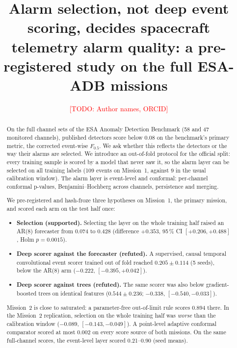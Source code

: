 \documentclass[preprint,12pt,authoryear]{elsarticle}
\newcommand{\todo}[1]{\textcolor{red}{[TODO: #1]}}
\begin{document}
\begin{frontmatter}
\title{Alarm selection, not deep event scoring, decides spacecraft telemetry alarm quality:
a pre-registered study on the full ESA-ADB missions}

\author[aff1]{\todo{Author names, ORCID}}
\affiliation[aff1]{organization={\todo{Affiliation}}, country={\todo{Country}}}

\begin{abstract}
On the full channel sets of the ESA Anomaly Detection Benchmark (58 and 47 monitored
channels), published detectors score below 0.08 on the benchmark's primary metric, the
corrected event-wise $F_{0.5}$. We ask whether this reflects the detectors or the way their
alarms are selected. We introduce an out-of-fold protocol for the official split: every
training sample is scored by a model that never saw it, so the alarm layer can be selected on
all training labels (109 events on Mission~1, against 9 in the usual calibration window).
The alarm layer is event-level and conformal: per-channel conformal p-values,
Benjamini--Hochberg across channels, persistence and merging.

We pre-registered and hash-froze three hypotheses on Mission~1, the primary mission, and
scored each arm on the test half once:
\begin{itemize}
\item \textbf{Selection (supported).} Selecting the layer on the whole training half raised
  an AR(8) forecaster from 0.074 to 0.428 (difference $+0.353$, 95\,\% CI
  $[+0.206,+0.488]$, Holm $p=0.0015$).
\item \textbf{Deep scorer against the forecaster (refuted).} A supervised, causal temporal
  convolutional event scorer trained out of fold reached $0.205\pm0.114$ (5 seeds), below
  the AR(8) arm ($-0.222$, $[-0.395,+0.042]$).
\item \textbf{Deep scorer against trees (refuted).} The same scorer was also below
  gradient-boosted trees on identical features ($0.544\pm0.236$; $-0.338$,
  $[-0.540,-0.033]$).
\end{itemize}

Mission~2 is close to saturated: a parameter-free out-of-limit rule scores 0.894 there. In
the Mission~2 replication, selection on the whole training half was \emph{worse} than the
calibration window ($-0.089$, $[-0.143,-0.049]$). A point-level adaptive conformal
comparator scored at most 0.002 on every score source of both missions. On the same
full-channel scores, the event-level layer scored 0.21--0.90 (seed means).


\end{abstract}
\end{frontmatter}
\end{document}
